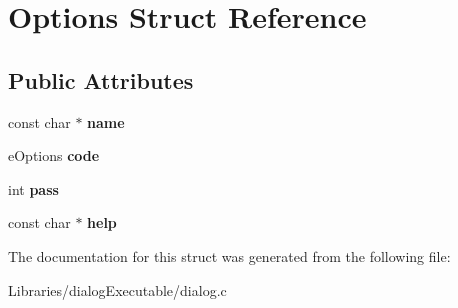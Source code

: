 \hypertarget{struct_options}{}\section{Options Struct Reference}
\label{struct_options}
\subsection*{Public Attributes}
\begin{DoxyCompactItemize}
\item 
const char $\ast$ {\bfseries name}\hypertarget{struct_options_a5616393c3c87f7f3f27b91834de2a981}{}\label{struct_options_a5616393c3c87f7f3f27b91834de2a981}

\item 
e\+Options {\bfseries code}\hypertarget{struct_options_af164cfbc8fa7a378c8a850f8db1aef9e}{}\label{struct_options_af164cfbc8fa7a378c8a850f8db1aef9e}

\item 
int {\bfseries pass}\hypertarget{struct_options_a5695557941893a1023bdb857745adc2e}{}\label{struct_options_a5695557941893a1023bdb857745adc2e}

\item 
const char $\ast$ {\bfseries help}\hypertarget{struct_options_a33e0d86e2289542e74bdf2c6fa9118b8}{}\label{struct_options_a33e0d86e2289542e74bdf2c6fa9118b8}

\end{DoxyCompactItemize}


The documentation for this struct was generated from the following file\+:\begin{DoxyCompactItemize}
\item 
Libraries/dialog\+Executable/dialog.\+c\end{DoxyCompactItemize}
